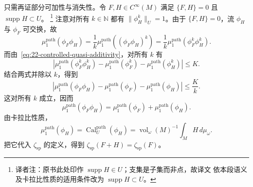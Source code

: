 只需再证部分可加性与消失性。令 $F,H\in C^\infty(M)$ 满足
$\{F,H\}=0$ 且 $\operatorname{supp}H\subset U$。
\footnote{译者注：原书此处印作 $\operatorname{supp}H\in U$；支集是子集而非点，故译文
依本段语义及卡拉比性质的适用条件改为 $\operatorname{supp}H\subset U$。}
注意对所有 $k\in\mathbb N$ 都有
$\lVert\phi_H^k\rVert_U=1$。由于 $\{F,H\}=0$，流 $\phi_H$ 与 $\phi_F$ 可交换，故
\[
 \mu_1^{\mathrm{path}}(\phi_F\phi_H)
 =\frac1k\mu_1^{\mathrm{path}}((\phi_F\phi_H)^k)
 =\frac1k\mu_1^{\mathrm{path}}(\phi_F^k\phi_H^k).
\]
而由~\eqref{eq:22-controlled-quasi-additivity}，对所有 $k$ 有
\[
 |\mu_1^{\mathrm{path}}(\phi_F^k\phi_H^k)
 -\mu_1^{\mathrm{path}}(\phi_F^k)-\mu_1^{\mathrm{path}}(\phi_H^k)|\leq K.
\]
结合两式并除以 $k$，得到
\[
 |\mu_1^{\mathrm{path}}(\phi_F\phi_H)-\mu_1^{\mathrm{path}}(\phi_F)
 -\mu_1^{\mathrm{path}}(\phi_H)|\leq\frac Kk.
\]
这对所有 $k$ 成立，因而
\[
 \mu_1^{\mathrm{path}}(\phi_F\phi_H)
 =\mu_1^{\mathrm{path}}(\phi_F)+\mu_1^{\mathrm{path}}(\phi_H).
\]
由卡拉比性质，
\[
 \mu_1^{\mathrm{path}}(\phi_H)
 =\operatorname{Cal}_U^{\mathrm{path}}(\phi_H)
 =\operatorname{vol}_\omega(M)^{-1}\int_M H\,d\mu_\omega.
\]
把它代入 $\zeta_{\mathrm{sp}}$ 的定义，得到
$\zeta_{\mathrm{sp}}(F+H)=\zeta_{\mathrm{sp}}(F)$。
